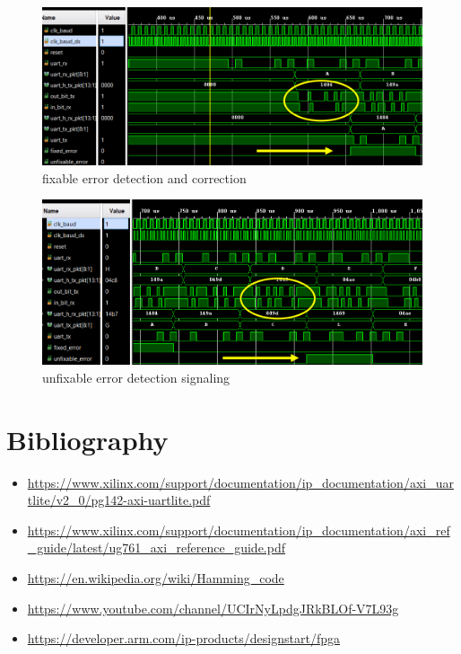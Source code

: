 \documentclass[11pt]{article}
\begin{document}
	\begin{figure}[H]
				\begin{center}
		
		\includegraphics[scale=0.65]{1 error}	
				\caption{fixable error detection and correction}
			\end{center}
	\end{figure}
	\begin{figure}[H]
		\begin{center}
		
		\includegraphics[scale=0.65]{2 errors}	
				\caption{unfixable error detection signaling}	
			\end{center}
	\end{figure}
	\clearpage
	\section{Bibliography}
	\begin{itemize}
		\item
		\url{https://www.xilinx.com/support/documentation/ip_documentation/axi\_uartlite/v2_0/pg142-axi-uartlite.pdf}
		\item \url{https://www.xilinx.com/support/documentation/ip_documentation/axi_ref_guide/latest/ug761_axi_reference_guide.pdf}
		\item \url{https://en.wikipedia.org/wiki/Hamming_code}
		\item \url{https://www.youtube.com/channel/UCIrNyLpdgJRkBLOf-V7L93g}
		\item \url{https://developer.arm.com/ip-products/designstart/fpga}
	\end{itemize}
\end{document}
